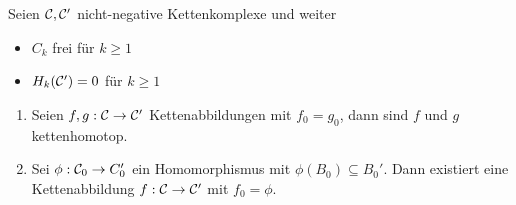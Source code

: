 
\begin{lemma}
	Seien $\mathcal{C}, \mathcal{C}'$ nicht-negative Kettenkomplexe und weiter
	\begin{itemize}
		\item $C_k$ frei für $k \geq 1$
		\item $H_k(\mathcal{C}') = 0$ für $k \geq 1$
	\end{itemize}
	\begin{enumerate}
		\item Seien $f,g : \mathcal{C} \rightarrow \mathcal{C}'$ Kettenabbildungen mit $f_0 = g_0$, dann sind $f$ und $g$ kettenhomotop.
		\item Sei $\phi : \mathcal{C}_0 \rightarrow C_0'$ ein Homomorphismus mit $\phi(B_0) \subseteq B_0'$.
		Dann existiert eine Kettenabbildung $f : \mathcal{C} \rightarrow \mathcal{C}'$ mit $f_0 = \phi$.
	\end{enumerate}
\end{lemma}
